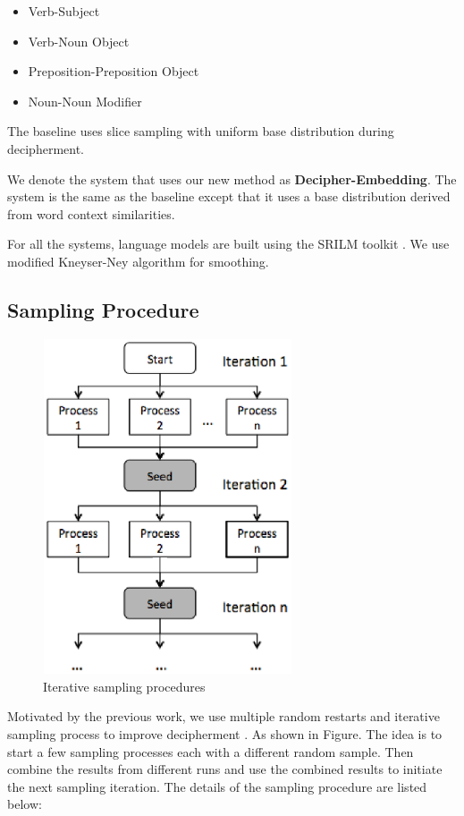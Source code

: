 \begin{itemize}
\item Verb-Subject
\item Verb-Noun Object
\item Preposition-Preposition Object
\item Noun-Noun Modifier
\end{itemize}

The baseline uses slice sampling with uniform base distribution during decipherment.

We denote the system that uses our new method as \textbf{Decipher-Embedding}. The system is the same as the baseline except that it uses a base distribution derived from word context similarities.  

For all the systems, language models are built using the SRILM toolkit \cite{srilm}. We use modified Kneyser-Ney \cite{KneserNey95} algorithm for smoothing.


\subsection{Sampling Procedure}
\label{sample_procedure}

 \begin{figure}[!ht]
  \centering
  \includegraphics[width=2.9in,height=3.9in]{iterative_sampling}
  \caption{Iterative sampling procedures}
\label{iterative_sampling}
\end{figure}

Motivated by the previous work, we use multiple random restarts and iterative sampling process to improve decipherment \cite{Dou:2012}. As shown in Figure. The idea is to start a few sampling processes each with a different random sample. Then combine the results from different runs and use the combined results to initiate the next sampling iteration. The details of the sampling procedure are listed below:

